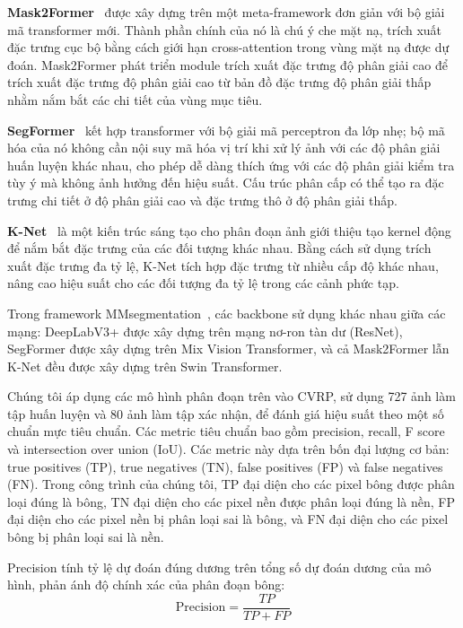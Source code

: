 \documentclass[12pt, a4paper]{article}
\begin{document}
\textbf{Mask2Former}~\cite{cheng2022} được xây dựng trên một meta-framework đơn giản với bộ
giải mã transformer mới. Thành phần chính của nó là chú ý che mặt nạ, trích xuất đặc trưng
cục bộ bằng cách giới hạn cross-attention trong vùng mặt nạ được dự đoán. Mask2Former phát
triển module trích xuất đặc trưng độ phân giải cao để trích xuất đặc trưng độ phân giải cao
từ bản đồ đặc trưng độ phân giải thấp nhằm nắm bắt các chi tiết của vùng mục tiêu.

\textbf{SegFormer}~\cite{xie2021} kết hợp transformer với bộ giải mã perceptron đa lớp nhẹ;
bộ mã hóa của nó không cần nội suy mã hóa vị trí khi xử lý ảnh với các độ phân giải huấn
luyện khác nhau, cho phép dễ dàng thích ứng với các độ phân giải kiểm tra tùy ý mà không ảnh
hưởng đến hiệu suất. Cấu trúc phân cấp có thể tạo ra đặc trưng chi tiết ở độ phân giải cao
và đặc trưng thô ở độ phân giải thấp.

\textbf{K-Net}~\cite{zhang2021} là một kiến trúc sáng tạo cho phân đoạn ảnh giới thiệu tạo
kernel động để nắm bắt đặc trưng của các đối tượng khác nhau. Bằng cách sử dụng trích xuất
đặc trưng đa tỷ lệ, K-Net tích hợp đặc trưng từ nhiều cấp độ khác nhau, nâng cao hiệu suất
cho các đối tượng đa tỷ lệ trong các cảnh phức tạp.

Trong framework MMsegmentation~\cite{mmseg2020}, các backbone sử dụng khác nhau giữa các
mạng: DeepLabV3+ được xây dựng trên mạng nơ-ron tàn dư (ResNet), SegFormer được xây dựng
trên Mix Vision Transformer, và cả Mask2Former lẫn K-Net đều được xây dựng trên Swin
Transformer.

Chúng tôi áp dụng các mô hình phân đoạn trên vào CVRP, sử dụng 727 ảnh làm tập huấn luyện
và 80 ảnh làm tập xác nhận, để đánh giá hiệu suất theo một số chuẩn mực tiêu chuẩn. Các
metric tiêu chuẩn bao gồm precision, recall, F score và intersection over union (IoU). Các
metric này dựa trên bốn đại lượng cơ bản: true positives (TP), true negatives (TN), false
positives (FP) và false negatives (FN). Trong công trình của chúng tôi, TP đại diện cho các
pixel bông được phân loại đúng là bông, TN đại diện cho các pixel nền được phân loại đúng là
nền, FP đại diện cho các pixel nền bị phân loại sai là bông, và FN đại diện cho các pixel
bông bị phân loại sai là nền.

Precision tính tỷ lệ dự đoán đúng dương trên tổng số dự đoán dương của mô hình, phản ánh độ
chính xác của phân đoạn bông:
\begin{equation}
  \text{Precision} = \frac{TP}{TP + FP}
\end{equation}
\end{document}
